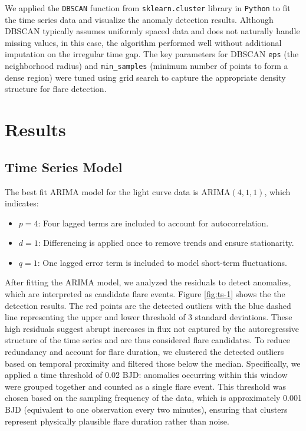 \documentclass[
]{article}
\begin{document}
We applied the \texttt{DBSCAN} function from \texttt{sklearn.cluster} library in \texttt{Python} to fit the time series data and visualize the anomaly detection results. Although DBSCAN typically assumes uniformly spaced data and does not naturally handle missing values, in this case, the algorithm performed well without additional imputation on the irregular time gap. The key parameters for DBSCAN \texttt{eps} (the neighborhood radius) and \texttt{min\_samples} (minimum number of points to form a dense region) were tuned using grid search to capture the appropriate density structure for flare detection.

\section{Results}\label{sec-results}

\subsection{Time Series Model}\label{time-series-model}

The best fit ARIMA model for the light curve data is ARIMA\((4,1,1)\), which indicates:

\begin{itemize}
    \item $p = 4$: Four lagged terms are included to account for autocorrelation.
    \item $d = 1$: Differencing is applied once to remove trends and ensure stationarity.
    \item $q = 1$: One lagged error term is included to model short-term fluctuations.
\end{itemize}

After fitting the ARIMA model, we analyzed the residuals to detect anomalies, which are interpreted as candidate flare events. Figure \ref{fig:ts-1} shows the the detection results. The red points are the detected outliers with the blue dashed line representing the upper and lower threshold of 3 standard deviations. These high residuals suggest abrupt increases in flux not captured by the autoregressive structure of the time series and are thus considered flare candidates. To reduce redundancy and account for flare duration, we clustered the detected outliers based on temporal proximity and filtered those below the median. Specifically, we applied a time threshold of 0.02 BJD: anomalies occurring within this window were grouped together and counted as a single flare event. This threshold was chosen based on the sampling frequency of the data, which is approximately 0.001 BJD (equivalent to one observation every two minutes), ensuring that clusters represent physically plausible flare duration rather than noise.
\end{document}
